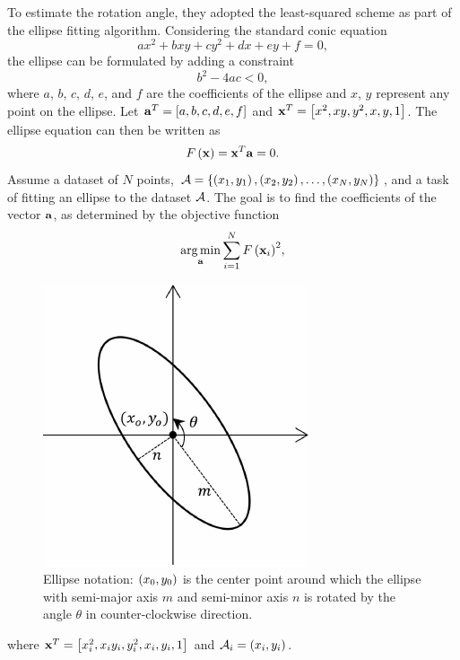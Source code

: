 To estimate the rotation angle, they adopted the least-squared scheme as part of the ellipse fitting algorithm. Considering the standard conic equation
\begin{equation}
    ax^2 + bxy + cy^2 + dx + ey + f = 0,
\end{equation}
the ellipse can be formulated by adding a constraint
\begin{equation}
    b^2 - 4ac < 0,
\end{equation}
where $a$, $b$, $c$, $d$, $e$, and $f$ are the coefficients of the ellipse and $x$, $y$ represent any point on the ellipse. Let ${\mathbf{a}}^T = \left[ {a, b, c, d, e, f} \right]$ and ${\mathbf{x}}^T = \left[ {x^2, xy, y^2, x, y, 1} \right]$. The ellipse equation can then be written as
\begin{equation}
    {F} \left( \mathbf{x} \right) = \mathbf{x}^T\mathbf{a} = 0.
\end{equation}
Assume a dataset of $N$ points, $\mathcal{A} = \left\{ {\left( {x_1, y_1} \right), \left( {x_2, y_2} \right), \dots, \left( {x_N, y_N} \right)} \right\}$, and a task of fitting an ellipse to the dataset $\mathcal{A}$. The goal is to find the coefficients of the vector $\mathbf{a}$, as determined by the objective function
\begin{equation}
    \underset{\mathbf{a}}{\operatorname*{arg\,min}} \sum_{i = 1}^{N} {{F} \left( \mathbf{x}_i \right)}^2,
\end{equation}

\begin{figure}[t]
    \centerline{\includegraphics[width=0.4\linewidth]{figures/theoretical_foundations/fast_vot_rot_bbox_ellipse.pdf}}
    \caption[Ellipse notation]{Ellipse notation: $\left( {x_0, y_0} \right)$ is the center point around which the ellipse with semi-major axis $m$ and semi-minor axis $n$ is rotated by the angle $\theta$ in counter-clockwise direction. }
    \label{fig:FastVOTRotBBOXEllipse}
\end{figure}
where $\mathbf{x}^T = \left[ {{x}_{i}^{2}, x_i y_i, {y}_{i}^{2}, x_i, y_i, 1} \right]$ and $\mathcal{A}_i = \left( {x_i, y_i} \right)$.

